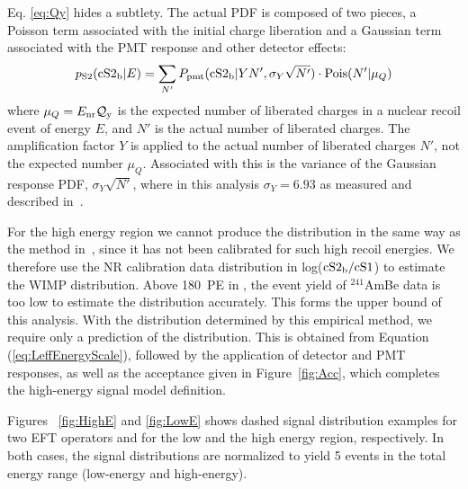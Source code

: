 Eq. \ref{eq:Qy} hides a subtlety. The actual \cSiib{} PDF is composed of two pieces, a Poisson term associated with the initial charge liberation and a Gaussian term associated with the PMT response and other detector effects:
%
\begin{equation}
\label{eq.cS2pdf}
p_\mathrm{S2}(\mathrm{\mathrm{cS2}_\mathrm{b}}|E) = \sum_{N'} P_\mathrm{pmt}(\mathrm{\mathrm{cS2}_\mathrm{b}}|Y N',\sigma_Y \sqrt{N'})\cdot\mathrm{Pois}(N'|\mu_Q)
\end{equation}
%
where $\mu_Q=E_{\mathrm{nr}}\mathcal{Q}_{\mathrm{y}}$ is the expected number of liberated charges in a nuclear recoil event of energy $E$, and $N'$ is the actual number of liberated charges. The amplification factor $Y$ is applied to the actual number of liberated charges $N'$, not the expected number $\mu_Q$. Associated with this is the variance of the Gaussian response PDF, $\sigma_Y\sqrt{N'}$, where in this analysis $\sigma_Y = 6.93$ as measured and described in~\cite{XenonSingleElectron}. 

For the high energy region we cannot produce the \Sii{} distribution in the same way as the method in~\cite{DataMCXenon}, since it  has not been calibrated for such high recoil energies. We therefore use the NR calibration data distribution in log($\mathrm{\mathrm{cS2}_\mathrm{b}/\mathrm{cS1}}$) to estimate the WIMP distribution. Above 180~PE in \cSi{}, the event yield of $^{241}$AmBe data is too low to estimate the distribution accurately. This forms the upper bound of this analysis. With the \cSiib{} distribution determined by this empirical method, we require only a prediction of the \cSi{} distribution. This is obtained from Equation (\ref{eq:LeffEnergyScale}), followed by the application of detector and PMT responses, as well as the acceptance given in Figure~\ref{fig:Acc}, which completes the high-energy signal model definition.

Figures ~\ref{fig:HighE} and \ref{fig:LowE} shows dashed signal distribution examples for two EFT operators and for the low and the high energy region, respectively.
In both cases, the signal distributions are normalized to yield 5 events in the total energy range (low-energy and high-energy).

